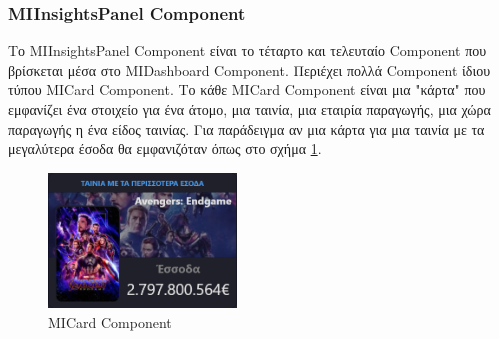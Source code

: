 \subsubsection{MIInsightsPanel Component}
Το MIInsightsPanel Component είναι το τέταρτο και τελευταίο Component που βρίσκεται μέσα στο MIDashboard Component.
Περιέχει πολλά Component ίδιου τύπου MICard Component. Το κάθε MICard Component είναι μια "κάρτα" που εμφανίζει ένα στοιχείο για ένα άτομο, μια ταινία, μια εταιρία παραγωγής, μια χώρα παραγωγής η ένα είδος ταινίας. Για παράδειγμα αν μια κάρτα για μια ταινία με τα μεγαλύτερα έσοδα θα εμφανιζόταν όπως στο σχήμα \ref{layout:micard_revenue}.

\begin{figure}[h]
  \centering
  \includegraphics[width=50mm]{Chapters/5 - Architecture/Client/Images/micard_revenue.png}
  \caption{MICard Component}
  \label{layout:micard_revenue}
\end{figure}


